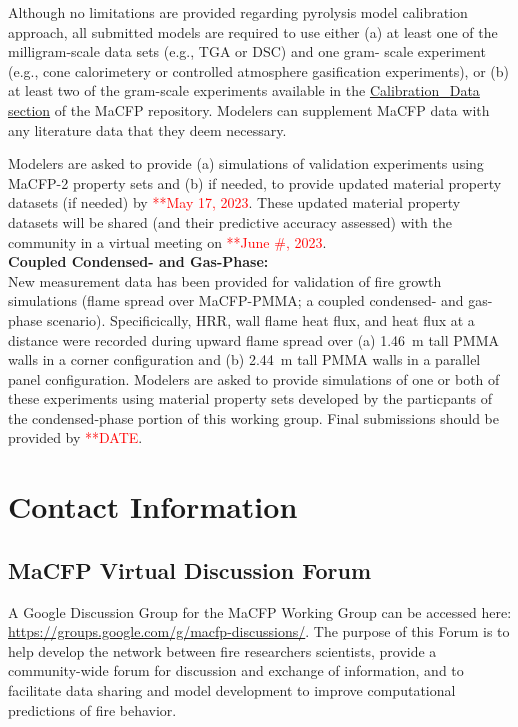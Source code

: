 \documentclass[12pt]{article}
\begin{document}
Although no limitations are provided regarding pyrolysis model calibration approach, all submitted models are required to use either (a) at least one of the milligram-scale data sets (e.g., TGA or DSC) and one gram- scale experiment (e.g., cone calorimetery or controlled atmosphere gasification experiments), or (b) at least two of the gram-scale experiments available in the \href{https://github.com/MaCFP/matl-db/tree/master/PMMA/Calibration_Data}{Calibration\_Data section} of the MaCFP repository. Modelers can supplement MaCFP data with any literature data that they deem necessary. 

Modelers are asked to provide (a) simulations of validation experiments using MaCFP-2 property sets and (b) if needed, to provide updated material property datasets (if needed) by \textcolor{red}{**May 17, 2023}. These updated material property datasets will be shared (and their predictive accuracy assessed) with the community in a virtual meeting on \textcolor{red}{**June \#, 2023}.\\

\textbf{Coupled Condensed- and Gas-Phase:}\\
New measurement data has been provided for validation of fire growth simulations (flame spread over MaCFP-PMMA; a coupled condensed- and gas-phase scenario). Specificically, HRR, wall flame heat flux, and heat flux at a distance were recorded during upward flame spread over (a) 1.46~m tall PMMA walls in a corner configuration and (b) 2.44~m tall PMMA walls in a parallel panel configuration.
Modelers are asked to provide simulations of one or both of these experiments using material property sets developed by the particpants of the condensed-phase portion of this working group. Final submissions should be provided by \textcolor{red}{**DATE}. \\


\clearpage
\section{Contact Information}
 \subsection*{MaCFP Virtual Discussion Forum}
A Google Discussion Group for the MaCFP Working Group can be accessed here: \url{https://groups.google.com/g/macfp-discussions/}. The purpose of this Forum is to help develop the network between fire researchers scientists, provide a community-wide forum for discussion and exchange of information, and to facilitate data sharing and model development to improve computational predictions of fire behavior.\\
\end{document}
